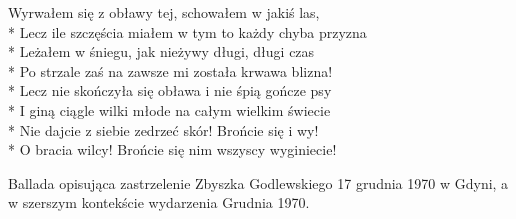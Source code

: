 \begin{lyrics}[longestline={Bo z trzema na raz walczy psami i trzech ran na raz krwawi.}]
\chorusref

Wyrwałem się z obławy tej, schowałem w jakiś las,\\*
Lecz ile szczęścia miałem w tym to każdy chyba przyzna\\*
Leżałem w śniegu, jak nieżywy długi, długi czas\\*
Po strzale zaś na zawsze mi została krwawa blizna!\\*
Lecz nie skończyła się obława i nie śpią gończe psy\\*
I giną ciągle wilki młode na całym wielkim świecie\\*
Nie dajcie z siebie zedrzeć skór! Brońcie się i wy!\\*
O bracia wilcy! Brońcie się nim wszyscy wyginiecie!

\chorusref
\end{lyrics}



\begin{info}Ballada opisująca zastrzelenie Zbyszka Godlewskiego 17 grudnia 1970 w Gdyni, a w szerszym kontekście wydarzenia Grudnia 1970.\end{info}

